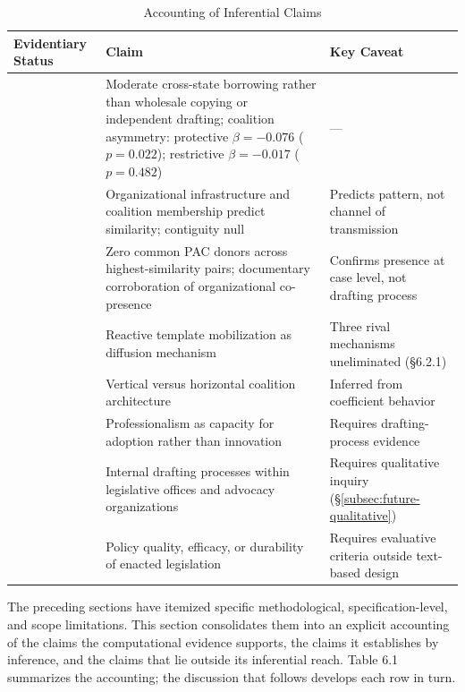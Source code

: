 \clearpage
\begin{table}[!t]
\centering
\caption{Accounting of Inferential Claims}
\label{tab:inferential_accounting}
\renewcommand{\arraystretch}{1.4}
\setlength{\tabcolsep}{8pt}
\small
\begin{tabular}{@{}>{\raggedright\arraybackslash}p{3.0cm} >{\raggedright\arraybackslash}p{6.8cm} >{\raggedright\arraybackslash}p{4.8cm}@{}}
\toprule
\textbf{Evidentiary Status} & \textbf{Claim} & \textbf{Key Caveat} \\
\midrule
\multirow{3}{=}{Demonstrated} 
 & Moderate cross-state borrowing rather than wholesale copying or independent drafting; coalition asymmetry: protective $\beta = -0.076$ ($p = 0.022$); restrictive $\beta = -0.017$ ($p = 0.482$) & --- \\
 \addlinespace[6pt]
 & Organizational infrastructure and coalition membership predict similarity; contiguity null & Predicts pattern, not channel of transmission \\
 \addlinespace[6pt]
 & Zero common PAC donors across highest-similarity pairs; documentary corroboration of organizational co-presence & Confirms presence at case level, not drafting process \\
\midrule
\multirow{3}{=}{Established by inference} 
 & Reactive template mobilization as diffusion mechanism & Three rival mechanisms uneliminated (\S6.2.1) \\
 \addlinespace[6pt]
 & Vertical versus horizontal coalition architecture & Inferred from coefficient behavior \\
 \addlinespace[6pt]
 & Professionalism as capacity for adoption rather than innovation & Requires drafting-process evidence \\
\midrule
\multirow{2}{=}{Outside inferential reach} 
 & Internal drafting processes within legislative offices and advocacy organizations & Requires qualitative inquiry (\S\ref{subsec:future-qualitative}) \\
 \addlinespace[6pt]
 & Policy quality, efficacy, or durability of enacted legislation & Requires evaluative criteria outside text-based design \\
\bottomrule
\end{tabular}
\end{table}
\clearpage

The preceding sections have itemized specific methodological, specification-level, and scope limitations. This section consolidates them into an explicit accounting of the claims the computational evidence supports, the claims it establishes by inference, and the claims that lie outside its inferential reach. Table 6.1 summarizes the accounting; the discussion that follows develops each row in turn.

